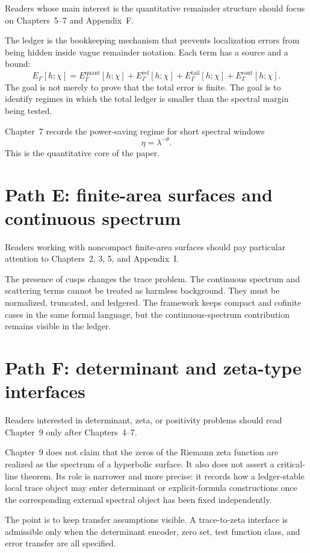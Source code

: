 Readers whose main interest is the quantitative remainder structure should focus on Chapters~5--7 and Appendix~F.

The ledger is the bookkeeping mechanism that prevents localization errors from being hidden inside vague remainder notation.  Each term has a source and a bound:
\[
  E_\Gamma[h;\chi]
  =
  E_\Gamma^{\mathrm{quant}}[h;\chi]
  +
  E_\Gamma^{\mathrm{ref}}[h;\chi]
  +
  E_\Gamma^{\mathrm{tail}}[h;\chi]
  +
  E_\Gamma^{\mathrm{cont}}[h;\chi].
\]
The goal is not merely to prove that the total error is finite.  The goal is to identify regimes in which the total ledger is smaller than the spectral margin being tested.

Chapter~7 records the power-saving regime for short spectral windows
\[
  \eta=\lambda^{-\theta}.
\]
This is the quantitative core of the paper.

\section*{Path E: finite-area surfaces and continuous spectrum}

Readers working with noncompact finite-area surfaces should pay particular attention to Chapters~2, 3, 5, and Appendix~I.

The presence of cusps changes the trace problem.  The continuous spectrum and scattering terms cannot be treated as harmless background.  They must be normalized, truncated, and ledgered.  The framework keeps compact and cofinite cases in the same formal language, but the continuous-spectrum contribution remains visible in the ledger.

\section*{Path F: determinant and zeta-type interfaces}

Readers interested in determinant, zeta, or positivity problems should read Chapter~9 only after Chapters~4--7.

Chapter~9 does not claim that the zeros of the Riemann zeta function are realized as the spectrum of a hyperbolic surface.  It also does not assert a critical-line theorem.  Its role is narrower and more precise: it records how a ledger-stable local trace object may enter determinant or explicit-formula constructions once the corresponding external spectral object has been fixed independently.

The point is to keep transfer assumptions visible.  A trace-to-zeta interface is admissible only when the determinant encoder, zero set, test function class, and error transfer are all specified.

